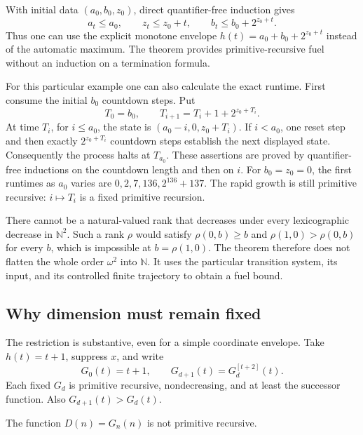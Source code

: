 With initial data $(a_0,b_0,z_0)$, direct quantifier-free induction gives
\[
 a_t\le a_0,\qquad z_t\le z_0+t,\qquad
 b_t\le b_0+2^{z_0+t}.
\]
Thus one can use the explicit monotone envelope
$h(t)=a_0+b_0+2^{z_0+t}$ instead of the automatic maximum.  The theorem
provides primitive-recursive fuel without an induction on a termination
formula.

For this particular example one can also calculate the exact runtime.
First consume the initial $b_0$ countdown steps.  Put
\[
 T_0=b_0,\qquad T_{i+1}=T_i+1+2^{z_0+T_i}.
\]
At time $T_i$, for $i\le a_0$, the state is
$(a_0-i,0,z_0+T_i)$.  If $i<a_0$, one reset step and then exactly
$2^{z_0+T_i}$ countdown steps establish the next displayed state.
Consequently the process halts at $T_{a_0}$.  These assertions are proved
by quantifier-free inductions on the countdown length and then on $i$.
For $b_0=z_0=0$, the first runtimes as $a_0$ varies are
$0,2,7,136,2^{136}+137$.  The rapid growth is still primitive recursive:
$i\mapsto T_i$ is a fixed primitive recursion.

There cannot be a natural-valued rank that decreases under every
lexicographic decrease in $\mathbb N^2$.  Such a rank $\rho$ would satisfy
$\rho(0,b)\ge b$ and
$\rho(1,0)>\rho(0,b)$ for every $b$, which is impossible at
$b=\rho(1,0)$.  The theorem therefore does not flatten the whole order
$\omega^2$ into $\mathbb N$.  It uses the particular transition system,
its input, and its controlled finite trajectory to obtain a fuel bound.

\subsection{Why dimension must remain fixed}

The restriction is substantive, even for a simple coordinate envelope.
Take $h(t)=t+1$, suppress $x$, and write
\[
 G_0(t)=t+1,\qquad G_{d+1}(t)=G_d^{[t+2]}(t).
\]
Each fixed $G_d$ is primitive recursive, nondecreasing, and at least the
successor function.  Also $G_{d+1}(t)>G_d(t)$.

\begin{proposition}
The function $D(n)=G_n(n)$ is not primitive recursive.
\end{proposition}

